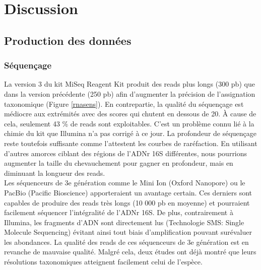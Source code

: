 \documentclass[12pt,a4paper]{article}
\begin{document}
\newpage
\section{Discussion}
\subsection{Production des données}
\subsubsection{Séquençage}
La version 3 du kit MiSeq Reagent Kit produit des reads plus longs (300 pb) que dans la version précédente (250 pb) afin d'augmenter la précision de l'assignation taxonomique (Figure \ref{rnasens}). En contrepartie, la qualité du séquençage est médiocre aux extrémités avec des scores qui chutent en dessous de 20. À cause de cela, seulement 43 \% de reads sont exploitables.
C'est un problème connu lié à la chimie du kit que Illumina n'a pas corrigé à ce jour. La profondeur de séquençage reste toutefois suffisante comme l'attestent les courbes de raréfaction. En utilisant d'autres amorces ciblant des régions de l'ADNr 16S différentes, nous pourrions augmenter la taille du chevauchement pour gagner en profondeur, mais en diminuant la longueur des reads. \\
Les séquenceurs de 3e génération comme le Mini Ion (Oxford Nanopore) ou le PacBio (Pacific Bioscience) apporteraient un avantage certain. Ces derniers sont capables de produire des reads très longs (10 000 pb en moyenne) et pourraient facilement séquencer l'intégralité de l'ADNr 16S. De plus, contrairement à Illumina, les fragments d'ADN sont directement lus (Technologie SMS: Single Molecule Sequencing) évitant ainsi tout biais d'amplification pouvant surévaluer les abondances.
La qualité des reads de ces séquenceurs de 3e génération est en revanche de mauvaise qualité. Malgré cela, deux études\cite{Wagner2016,Benitez-Paez2016} ont déjà montré que leurs résolutions taxonomiques atteignent facilement celui de l’espèce.
\end{document}
